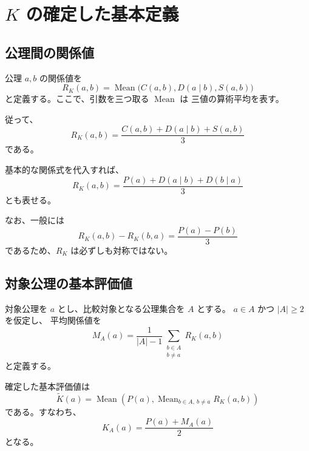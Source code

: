 \documentclass[a4paper,11pt]{ltjsarticle}
\begin{document}
\section{$K$ の確定した基本定義}

\subsection{公理間の関係値}

公理 $a,b$ の関係値を
\begin{equation}
  R_K(a,b)
  =
  \operatorname{Mean}
  \bigl(C(a,b),D(a\mid b),S(a,b)\bigr)
\end{equation}
と定義する。ここで、引数を三つ取る $\operatorname{Mean}$ は
三値の算術平均を表す。

従って、
\begin{equation}
  R_K(a,b)
  =
  \frac{
    C(a,b)+D(a\mid b)+S(a,b)
  }{3}
\end{equation}
である。

基本的な関係式を代入すれば、
\begin{equation}
  R_K(a,b)
  =
  \frac{
    P(a)+D(a\mid b)+D(b\mid a)
  }{3}
\end{equation}
とも表せる。

なお、一般には
\begin{equation}
  R_K(a,b)-R_K(b,a)
  =
  \frac{P(a)-P(b)}{3}
\end{equation}
であるため、$R_K$ は必ずしも対称ではない。

\subsection{対象公理の基本評価値}

対象公理を $a$ とし、比較対象となる公理集合を $A$ とする。
$a\in A$ かつ $|A|\geq 2$ を仮定し、
平均関係値を
\begin{equation}
  M_A(a)
  =
  \frac{1}{|A|-1}
  \sum_{\substack{b\in A\\b\ne a}}R_K(a,b)
\end{equation}
と定義する。

確定した基本評価値は
\begin{equation}
  \boxed{
  \widetilde{K}(a)
  =
  \operatorname{Mean}
  \left(
    P(a),
    \operatorname{Mean}_{b\in A,\ b\ne a}R_K(a,b)
  \right)
  }
\end{equation}
である。すなわち、
\begin{equation}
  \boxed{
  K_A(a)=\frac{P(a)+M_A(a)}{2}
  }
\end{equation}
となる。
\end{document}
